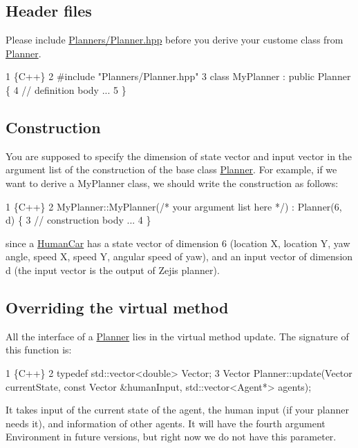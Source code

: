 \subsection*{Header files}

Please include {\ttfamily \hyperlink{Planner_8hpp}{Planners/\+Planner.\+hpp}} before you derive your custome class from {\ttfamily \hyperlink{classPlanner}{Planner}}. 
\begin{DoxyCode}
1 \{C++\}
2 #include "Planners/Planner.hpp"
3 class MyPlanner : public Planner \{
4     // definition body ...
5 \}
\end{DoxyCode}


\subsection*{Construction}

You are supposed to specify the dimension of {\ttfamily state} vector and {\ttfamily input} vector in the argument list of the construction of the base class {\ttfamily \hyperlink{classPlanner}{Planner}}. For example, if we want to derive a {\ttfamily My\+Planner} class, we should write the construction as follows\+: 
\begin{DoxyCode}
1 \{C++\}
2 MyPlanner::MyPlanner(/* your argument list here */) : Planner(6, d) \{
3     // construction body ...
4 \}
\end{DoxyCode}
 since a {\ttfamily \hyperlink{classHumanCar}{Human\+Car}} has a state vector of dimension 6 (location X, location Y, yaw angle, speed X, speed Y, angular speed of yaw), and an input vector of dimension d (the {\ttfamily input} vector is the output of Zeji\textquotesingle{}s planner).

\subsection*{Overriding the virtual method}

All the interface of a {\ttfamily \hyperlink{classPlanner}{Planner}} lies in the virtual method {\ttfamily update}. The signature of this function is\+: 
\begin{DoxyCode}
1 \{C++\}
2 typedef std::vector<double> Vector;
3 Vector Planner::update(Vector currentState, const Vector &humanInput, std::vector<Agent*> agents);
\end{DoxyCode}


It takes input of the current state of the agent, the human input (if your planner needs it), and information of other agents. It will have the fourth argument {\ttfamily Environment} in future versions, but right now we do not have this parameter.

